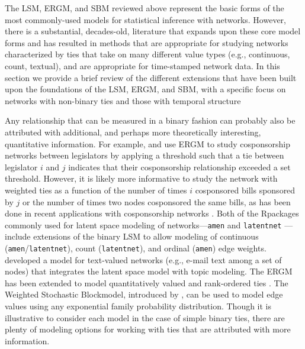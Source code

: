 \documentclass[fleqn,12pt]{wlscirep}
\newcommand{\R}{\textsf{R}\space} %
\begin{document}
The LSM, ERGM, and SBM reviewed above represent the basic forms of the most commonly-used models for statistical inference with networks. However, there is a substantial, decades-old, literature that expands upon these core model forms and has resulted in methods that are appropriate for studying networks characterized by ties that take on many different value types (e.g., continuous, count, textual), and are appropriate for time-stamped network data. In this section we provide a brief review of the different extensions that have been built upon the foundations of the LSM, ERGM, and SBM, with a specific focus on networks with non-binary ties and those with temporal structure

Any relationship that can be measured in a binary fashion can probably also be attributed with additional, and perhaps more theoretically interesting, quantitative information. For example, \citet{cranmer2011inferential} and \citet{baller2017specialists}  use ERGM to study cosponsorship networks between legislators by applying a threshold such that a tie between legislator $i$ and $j$ indicates that their cosponsorship relationship exceeded a set threshold. However, it is likely more informative to study the network with weighted ties as a function of the number of times $i$ cosponsored bills sponsored by $j$ or the number of times two nodes cosponsored the same bills, as has been done in recent applications with cosponsorship networks \citep[e.g., ][]{kirkland2012multimember, signorelli2018penalized}. Both of the \R packages commonly used for latent space modeling of networks---\texttt{amen} \citep{amen} and \texttt{latentnet} \citep{latentnet}---include extensions of the binary LSM to allow modeling of continuous (\texttt{amen}/\texttt{latentnet}), count (\texttt{latentnet}), and ordinal (\texttt{amen}) edge weights. \cite{krafft2012topic} developed a model for text-valued networks (e.g., e-mail text among a set of nodes) that integrates the latent space model with topic modeling. The ERGM has been extended to model quantitatively valued and rank-ordered ties \citep{wyatt2009dynamic, krivitsky2012exponential,desmarais2012statistical, krivitsky2017exponential}. The Weighted Stochastic Blockmodel, introduced by \cite{aicher2014learning}, can be used to model edge values using any exponential family probability distribution. Though it is illustrative to consider each model in the case of simple binary ties, there are plenty of modeling options for working with ties that are attributed with more information.
\end{document}
